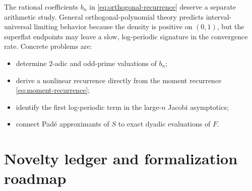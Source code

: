 \documentclass[11pt,oneside]{article}
\theoremstyle{definition}
\theoremstyle{remark}
\begin{document}
The rational coefficients $b_n$ in \eqref{eq:orthogonal-recurrence} deserve a separate arithmetic study.  General orthogonal-polynomial theory predicts interval-universal limiting behavior because the density is positive on $(0,1)$, but the superflat endpoints may leave a slow, log-periodic signature in the convergence rate.  Concrete problems are:
\begin{itemize}
\item determine $2$-adic and odd-prime valuations of $b_n$;
\item derive a nonlinear recurrence directly from the moment recurrence \eqref{eq:moment-recurrence};
\item identify the first log-periodic term in the large-$n$ Jacobi asymptotics;
\item connect Pad\'e approximants of $S$ to exact dyadic evaluations of $F$.
\end{itemize}

\section{Novelty ledger and formalization roadmap}
\end{document}
